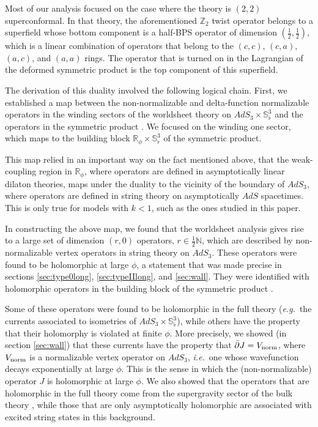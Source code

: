 \documentclass[12pt]{article}
\def\ie{{i.e.}}
\def\eg{{e.g.}}
\def\half{\frac12}
\newcommand{\bN}{{\mathbb N}}
\newcommand{\bR}{{\mathbb R}}
\newcommand{\bS}{{\mathbb S}}
\newcommand{\bZ}{{\mathbb Z}}
\numberwithin{equation}{section}
\def\ie{{\it i.e.}}
\def\eg{{\it e.g.}}
\def\half{\frac12}
\def\ie{{\it i.e.}}
\def\eg{{\it e.g.}}
\begin{document}
Most of our analysis focused on the case where the theory is $(2,2)$ superconformal. In that theory, the aforementioned $\bZ_2$ twist operator belongs to a superfield whose bottom component is a half-BPS operator of dimension $\left(\half,\half\right)$, which is a linear combination of operators that belong to the $(c,c)$, $(c,a)$, $(a,c)$, and $(a,a)$ rings. The operator that is turned on in the Lagrangian of the deformed symmetric product is the top component of this superfield.  

The derivation of this duality involved the following logical chain. First, we established a map between the non-normalizable and delta-function normalizable operators in the winding sectors of the worldsheet theory on $AdS_3\times \bS^3_\flat$ and the operators in the symmetric product \ourcft. We focused on the winding one sector, which maps to the building block $\bR_\phi\times \bS^3_\flat$ of the symmetric product. 

This map relied in an important way on the fact mentioned above, that the weak-coupling region in $\bR_\phi$, where operators are defined in asymptotically linear dilaton theories, maps under the duality to the vicinity of the boundary of $AdS_3$, where operators are defined in string theory on asymptotically $AdS$ spacetimes. This is only true for models with $k<1$, such as the ones studied in this paper.

In constructing the above map, we found that the worldsheet analysis gives rise to a large set of dimension $(r,0)$ operators, $r\in\half\bN$, which are described by non-normalizable vertex operators in string theory on $AdS_3$. These operators were found to be holomorphic at large $\phi$, a statement that was made precise in sections \ref{sec:type0long}, \ref{sec:typeIIlong}, and \ref{sec:wall}. They were identified with holomorphic operators in the building block of the symmetric product \ourcft. 

Some of these operators were found to be holomorphic in the full theory (\eg\ the currents associated to isometries of $AdS_3\times \bS^3_\flat$), while others have the property that their holomorphy is violated at finite $\phi$. More precisely, we showed (in section \ref{sec:wall}) that these currents have the property that $\bar\partial J= V_{\rm norm}$, where $V_{\rm norm}$ is a normalizable vertex operator on $AdS_3$, \ie\ one whose wavefunction decays exponentially at large $\phi$. This is the sense in which the (non-normalizable) operator $J$ is holomorphic at large $\phi$. We also showed that the operators that are holomorphic in the full theory come from the supergravity sector of the bulk theory \ourads, while those that are only asymptotically holomorphic are associated with excited string states in this background. 
\end{document}
